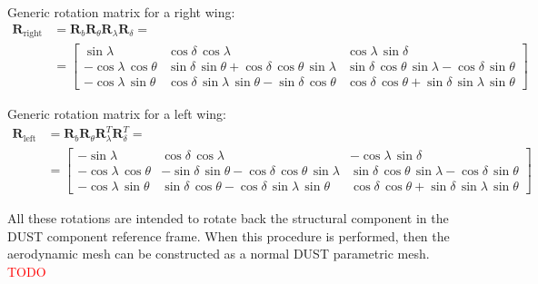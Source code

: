 Generic rotation matrix for a right wing: 
\begin{align*}
    \mathbf{R}_{\text{right}}& =   
    \mathbf{R}_{b}\mathbf{R}_{\theta}\mathbf{R}_{\lambda}\mathbf{R}_{\delta} = \\
    &=\begin{bmatrix}
    \sin\lambda  & 
    \cos\delta \,\cos\lambda  & 
    \cos\lambda \,\sin\delta \\
    -\cos\lambda \,\cos\theta  & 
    \sin\delta \,\sin\theta +\cos\delta \,\cos\theta \,\sin\lambda  & 
    \sin\delta \,\cos\theta \,\sin\lambda -\cos\delta \,\sin\theta \\ 
    -\cos\lambda \,\sin\theta  & 
    \cos\delta \,\sin\lambda \,\sin\theta -\sin\delta \,\cos\theta  & 
    \cos\delta \,\cos\theta +\sin\delta \,\sin\lambda \,\sin\theta
    \end{bmatrix}
\end{align*}

Generic rotation matrix for a left wing: 
\begin{align*}
    \mathbf{R}_{\text{left}}&=   
    \mathbf{R}_{b}\mathbf{R}_{\theta}\mathbf{R}_{\lambda}^T\mathbf{R}_{\delta}^T =\\
    &=\begin{bmatrix} 
    -\sin\lambda  &
    \cos\delta \,\cos\lambda  &
    -\cos\lambda \,\sin\delta \\
    -\cos\lambda \,\cos\theta  & 
    -\sin\delta \,\sin\theta -\cos\delta \,\cos\theta \,\sin\lambda  & 
    \sin\delta \,\cos\theta \,\sin\lambda -\cos\delta \,\sin\theta \\ 
    -\cos\lambda \,\sin\theta  & 
    \sin\delta \,\cos\theta -\cos\delta \,\sin\lambda \,\sin\theta  &
    \cos\delta \,\cos\theta +\sin\delta \,\sin\lambda \,\sin\theta  
    \end{bmatrix}
\end{align*}

All these rotations are intended to rotate back the structural component in 
the DUST component reference frame. When this procedure is performed, then 
the aerodynamic mesh can be constructed as a normal DUST parametric mesh. 
\textcolor{red}{TODO}


